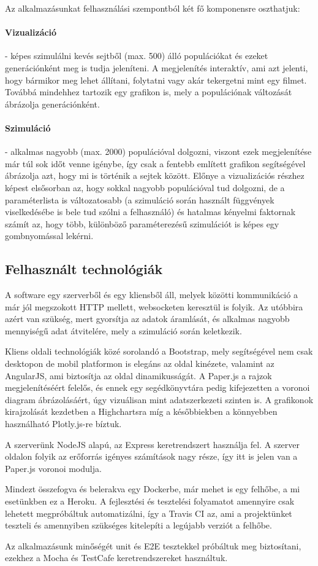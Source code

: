 Az alkalmazásunkat felhasználási szempontból két fő komponensre oszthatjuk:

\paragraph{Vizualizáció}- képes szimulálni kevés sejtből (max. 500) álló populációkat és ezeket generációnként meg is tudja jeleníteni. A megjelenítés interaktív, ami azt jelenti, hogy bármikor meg lehet állítani, folytatni vagy akár tekergetni mint egy filmet. Továbbá mindehhez tartozik egy grafikon is, mely a populációnak változását ábrázolja generációnként.

\paragraph{Szimuláció}- alkalmas nagyobb (max. 2000) populációval dolgozni, viszont ezek megjelenítése már túl sok időt venne igénybe, így csak a fentebb említett grafikon segítségével ábrázolja azt, hogy mi is történik a sejtek között. Előnye a vizualizációs részhez képest elsősorban az, hogy sokkal nagyobb populációval tud dolgozni, de a paraméterlista is változatosabb (a szimuláció során használt függvények viselkedésébe is bele tud szólni a felhasználó) és hatalmas kényelmi faktornak számít az, hogy több, különböző paraméterezésű szimulációt is képes egy gombnyomással lekérni.

\subsection{Felhasznált technológiák}

A software egy szerverből és egy kliensből áll, melyek közötti kommunikáció a már jól megszokott HTTP mellett, websocketen keresztül is folyik. Az utóbbira azért van szükség, mert gyorsítja az adatok áramlását, és alkalmas nagyobb mennyiségű adat átvitelére, mely a szimuláció során keletkezik. 

Kliens oldali technológiák közé sorolandó a Bootstrap, mely segítségével nem csak desktopon de mobil platformon is elegáns az oldal kinézete, valamint az AngularJS, ami biztosítja az oldal dinamikusságát. A Paper.js a rajzok megjelenítéséért felelős, és ennek egy segédkönyvtára pedig kifejezetten a voronoi diagram ábrázolásáért, úgy vizuálisan mint adatszerkezeti szinten is. A grafikonok kirajzolását kezdetben a Highchartsra míg a későbbiekben a könnyebben használható Plotly.js-re bíztuk.

A szerverünk NodeJS alapú, az Express keretrendszert használja fel. A szerver oldalon folyik az erőforrás igényes számítások nagy része, így itt is jelen van a Paper.js voronoi modulja.

Mindezt összefogva és belerakva egy Dockerbe, már mehet is egy felhőbe, a mi esetünkben ez a Heroku. A fejlesztési és tesztelési folyamatot amennyire csak lehetett megpróbáltuk automatizálni, így a Travis CI az, ami a projektünket teszteli és amennyiben szükséges kitelepíti a legújabb verziót a felhőbe.

Az alkalmazásunk minőségét unit és E2E tesztekkel próbáltuk meg biztosítani, ezekhez a Mocha és TestCafe keretrendszereket használtuk. 
